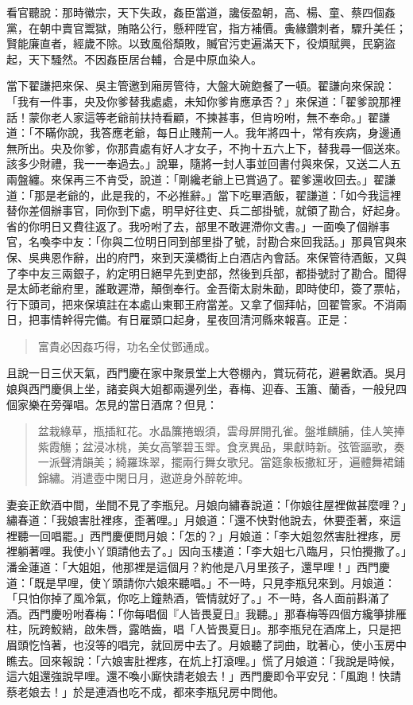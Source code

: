 看官聽說：那時徽宗，天下失政，姦臣當道，讒佞盈朝，高、楊、童、蔡四個姦黨，在朝中賣官鬻獄，賄賂公行，懸秤陞官，指方補價。夤緣鑽刺者，驟升美任；賢能廉直者，經歲不除。以致風俗頹敗，贓官污吏遍滿天下，役煩賦興，民窮盜起，天下騷然。不因姦臣居台輔，合是中原血染人。

當下翟謙把來保、吳主管邀到廂房管待，大盤大碗飽餐了一頓。翟謙向來保說：「我有一件事，央及你爹替我處處，未知你爹肯應承否？」來保道：「翟爹說那裡話！蒙你老人家這等老爺前扶持看顧，不揀甚事，但肯吩咐，無不奉命。」翟謙道：「不瞞你說，我答應老爺，每日止賤荊一人。我年將四十，常有疾病，身邊通無所出。央及你爹，你那貴處有好人才女子，不拘十五六上下，替我尋一個送來。該多少財禮，我一一奉過去。」說畢，隨將一封人事並回書付與來保，又送二人五兩盤纏。來保再三不肯受，說道：「剛纔老爺上已賞過了。翟爹還收回去。」翟謙道：「那是老爺的，此是我的，不必推辭。」當下吃畢酒飯，翟謙道：「如今我這裡替你差個辦事官，同你到下處，明早好往吏、兵二部掛號，就領了勘合，好起身。省的你明日又費往返了。我吩咐了去，部里不敢遲滯你文書。」一面喚了個辦事官，名喚李中友：「你與二位明日同到部里掛了號，討勘合來回我話。」那員官與來保、吳典恩作辭，出的府門，來到天漢橋街上白酒店內會話。來保管待酒飯，又與了李中友三兩銀子，約定明日絕早先到吏部，然後到兵部，都掛號討了勘合。聞得是太師老爺府里，誰敢遲滯，顛倒奉行。金吾衛太尉朱勔，即時使印，簽了票帖，行下頭司，把來保填註在本處山東鄆王府當差。又拿了個拜帖，回翟管家。不消兩日，把事情幹得完備。有日雇頭口起身，星夜回清河縣來報喜。正是：
\begin{quote}
富貴必因姦巧得，功名全仗鄧通成。
\end{quote}

且說一日三伏天氣，西門慶在家中聚景堂上大卷棚內，賞玩荷花，避暑飲酒。吳月娘與西門慶俱上坐，諸妾與大姐都兩邊列坐，春梅、迎春、玉簫、蘭香，一般兒四個家樂在旁彈唱。怎見的當日酒席？但見：
\begin{quote}
盆栽綠草，瓶插紅花。水晶簾捲蝦須，雲母屏開孔雀。盤堆麟脯，佳人笑捧紫霞觴；盆浸冰桃，美女高擎碧玉斝。食烹異品，果獻時新。弦管謳歌，奏一派聲清韻美；綺羅珠翠，擺兩行舞女歌兒。當筵象板撒紅牙，遍體舞裙鋪錦繡。消遣壺中閑日月，遨遊身外醉乾坤。
\end{quote}

妻妾正飲酒中間，坐間不見了李瓶兒。月娘向繡春說道：「你娘往屋裡做甚麼哩？」繡春道：「我娘害肚裡疼，歪著哩。」月娘道：「還不快對他說去，休要歪著，來這裡聽一回唱罷。」西門慶便問月娘：「怎的？」月娘道：「李大姐忽然害肚裡疼，房裡躺著哩。我使小丫頭請他去了。」因向玉樓道：「李大姐七八臨月，只怕攪撒了。」潘金蓮道：「大姐姐，他那裡是這個月？約他是八月里孩子，還早哩！」西門慶道：「既是早哩，使丫頭請你六娘來聽唱。」不一時，只見李瓶兒來到。月娘道：「只怕你掉了風冷氣，你吃上鐘熱酒，管情就好了。」不一時，各人面前斟滿了酒。西門慶吩咐春梅：「你每唱個『人皆畏夏日』我聽。」那春梅等四個方纔箏排雁柱，阮跨鮫綃，啟朱唇，露皓齒，唱「人皆畏夏日」。那李瓶兒在酒席上，只是把眉頭忔㤘著，也沒等的唱完，就回房中去了。月娘聽了詞曲，耽著心，使小玉房中瞧去。回來報說：「六娘害肚裡疼，在炕上打滾哩。」慌了月娘道：「我說是時候，這六姐還強說早哩。還不喚小廝快請老娘去！」西門慶即令平安兒：「風跑！快請蔡老娘去！」於是連酒也吃不成，都來李瓶兒房中問他。

